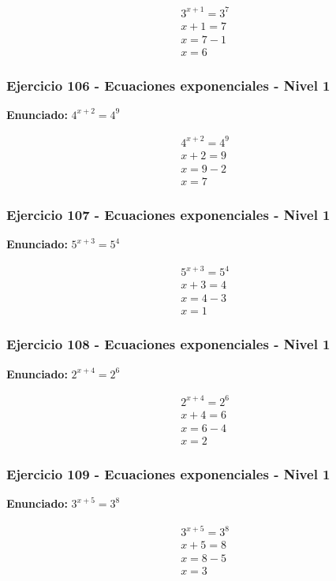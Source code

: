 \documentclass[12pt,a4paper]{article}
\begin{document}
\[
\begin{aligned}
3^{x+1}=3^{7}\\
x+1=7\\
x=7-1\\
\boxed{x=6}
\end{aligned}
\]


\subsubsection*{Ejercicio 106 - Ecuaciones exponenciales - Nivel 1}
\textbf{Enunciado:} \(4^{x+2}=4^{9}\)

\[
\begin{aligned}
4^{x+2}=4^{9}\\
x+2=9\\
x=9-2\\
\boxed{x=7}
\end{aligned}
\]


\subsubsection*{Ejercicio 107 - Ecuaciones exponenciales - Nivel 1}
\textbf{Enunciado:} \(5^{x+3}=5^{4}\)

\[
\begin{aligned}
5^{x+3}=5^{4}\\
x+3=4\\
x=4-3\\
\boxed{x=1}
\end{aligned}
\]


\subsubsection*{Ejercicio 108 - Ecuaciones exponenciales - Nivel 1}
\textbf{Enunciado:} \(2^{x+4}=2^{6}\)

\[
\begin{aligned}
2^{x+4}=2^{6}\\
x+4=6\\
x=6-4\\
\boxed{x=2}
\end{aligned}
\]


\subsubsection*{Ejercicio 109 - Ecuaciones exponenciales - Nivel 1}
\textbf{Enunciado:} \(3^{x+5}=3^{8}\)

\[
\begin{aligned}
3^{x+5}=3^{8}\\
x+5=8\\
x=8-5\\
\boxed{x=3}
\end{aligned}
\]
\end{document}
